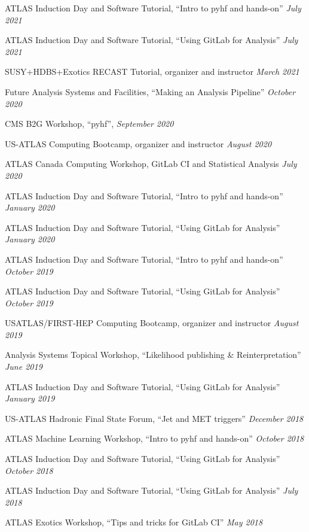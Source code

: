 \documentclass[margin,line]{resume}
\begin{document}
\begin{resume}
\begin{list2}
  \item ATLAS Induction Day and Software Tutorial, ``Intro to pyhf and hands-on'' \hfill \textsl{July 2021}
  \item ATLAS Induction Day and Software Tutorial, ``Using GitLab for Analysis'' \hfill \textsl{July 2021}
  \item SUSY+HDBS+Exotics RECAST Tutorial, organizer and instructor \hfill \textsl{March 2021}
  \item Future Analysis Systems and Facilities, ``Making an Analysis Pipeline'' \hfill \textsl{October 2020}
  \item CMS B2G Workshop, ``pyhf'', \hfill \textsl{September 2020}
  \item US-ATLAS Computing Bootcamp, organizer and instructor \hfill \textsl{August 2020}
  \item ATLAS Canada Computing Workshop, GitLab CI and Statistical Analysis \hfill \textsl{July 2020}
  \item ATLAS Induction Day and Software Tutorial, ``Intro to pyhf and hands-on'' \hfill \textsl{January 2020}
  \item ATLAS Induction Day and Software Tutorial, ``Using GitLab for Analysis'' \hfill \textsl{January 2020}
  \item ATLAS Induction Day and Software Tutorial, ``Intro to pyhf and hands-on'' \hfill \textsl{October 2019}
  \item ATLAS Induction Day and Software Tutorial, ``Using GitLab for Analysis'' \hfill \textsl{October 2019}
  \item USATLAS/FIRST-HEP Computing Bootcamp, organizer and instructor \hfill \textsl{August 2019}
  \item Analysis Systems Topical Workshop, ``Likelihood publishing \& Reinterpretation'' \hfill \textsl{June 2019}
  \item ATLAS Induction Day and Software Tutorial, ``Using GitLab for Analysis'' \hfill \textsl{January 2019}
  \item US-ATLAS Hadronic Final State Forum, ``Jet and MET triggers'' \hfill \textsl{December 2018}
  \item ATLAS Machine Learning Workshop, ``Intro to pyhf and hands-on'' \hfill \textsl{October 2018}
  \item ATLAS Induction Day and Software Tutorial, ``Using GitLab for Analysis'' \hfill \textsl{October 2018}
  \item ATLAS Induction Day and Software Tutorial, ``Using GitLab for Analysis'' \hfill \textsl{July 2018}
  \item ATLAS Exotics Workshop, ``Tips and tricks for GitLab CI'' \hfill \textsl{May 2018}

\end{list2}
\end{resume}
\end{document}
